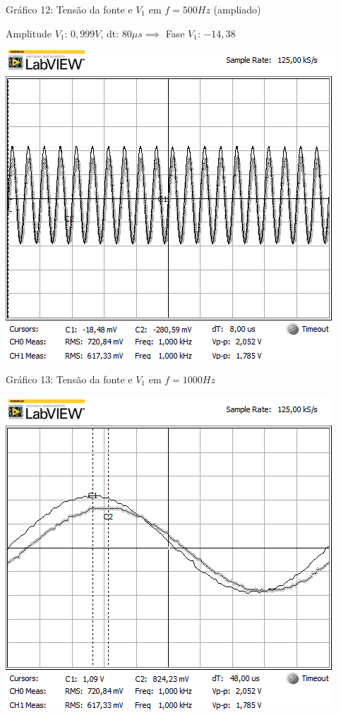 \begin{center}
Gráfico 12: Tensão da fonte e $V_1$ em $f=500Hz$ (ampliado)
\end{center}

Amplitude $V_1$: $0,999V$, dt: $80\mu s\implies$ Fase $V_1$: $-14,38$\textdegree

\newpage
\begin{table}[h]
\centering
\includegraphics[scale=0.725]{rgadicoas/rgadicoa3}
\end{table}

\begin{center}
Gráfico 13: Tensão da fonte e $V_1$ em $f=1000Hz$ 
\end{center}

\begin{table}[h]
\centering
\includegraphics[scale=0.725]{rgadicoas/rgadicoa3-2}
\end{table}

